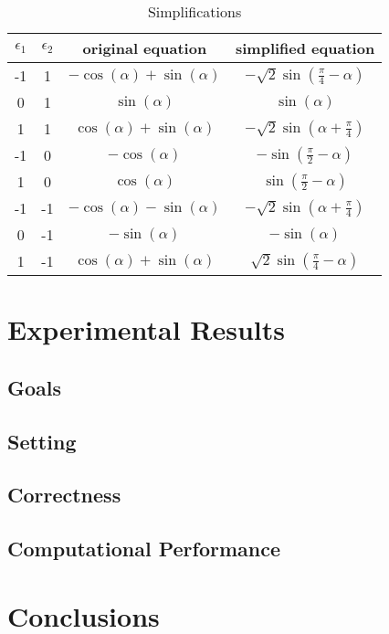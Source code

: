 \documentclass[draft]{article}
\begin{document}
\begin{table}
\centering
\begin{tabular}{c c | c | c}
$\epsilon_1$ & $\epsilon_2$ & original equation & simplified equation\\
\hline
-1 & 1 & $-\cos(\alpha)+\sin(\alpha)$ & $-\sqrt{2}\sin(\frac{\pi}{4}-\alpha)$\\
0 & 1 & $\sin(\alpha)$ & $\sin(\alpha)$\\
1 & 1 & $\cos(\alpha) + \sin(\alpha)$ & $-\sqrt{2}\sin(\alpha+\frac{\pi}{4})$\\
-1 & 0 & $-\cos(\alpha)$ & $-\sin(\frac{\pi}{2}-\alpha)$\\
1 & 0 & $\cos(\alpha)$ & $\sin(\frac{\pi}{2}-\alpha)$\\
-1 & -1 & $-\cos(\alpha)-\sin(\alpha)$ & $-\sqrt{2}\sin(\alpha+\frac{\pi}{4})$\\
0 & -1 & $-\sin(\alpha)$ & $-\sin(\alpha)$\\
1 & -1 & $\cos(\alpha) + \sin(\alpha)$ & $\sqrt{2}\sin(\frac{\pi}{4}-\alpha)$\\
\end{tabular}
\caption{Simplifications}
\label{tab:simplifications}
\end{table}

\section{Experimental Results}\label{sec:experimental_results}


\subsection{Goals}\label{sec:goals}

\subsection{Setting}\label{sec:setting}

\subsection{Correctness}\label{sec:correctness}

\subsection{Computational Performance}\label{sec:computational_performance}

\section{Conclusions}\label{sec:conclusions}




\end{document}
